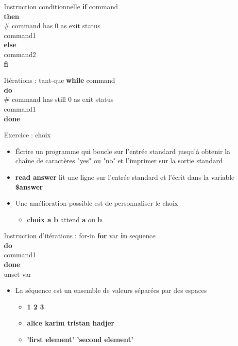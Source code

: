 \documentclass[xcolor=table]{beamer}
\begin{document}
\begin{frame}{Instruction conditionnelle}
\textbf{if} command\\
\textbf{then}\\
\quad \# command has 0 as exit status\\
\quad command1\\
\textbf{else}\\
\quad command2\\
\textbf{fi}\\
\end{frame}

\begin{frame}{Itérations : tant-que}
\textbf{while} command\\
\textbf{do}\\
\quad \# command has still 0 as exit status\\
\quad command1\\
\textbf{done}\\
\end{frame}

\begin{frame}{Exercice : choix}
\begin{itemize}
    \item Écrire un programme qui boucle sur l'entrée standard jusqu'à obtenir la chaîne de caractères "yes" ou "no" et l'imprimer sur la sortie standard
    \item \textbf{read answer} lit une ligne sur l'entrée standard et l'écrit dans la variable \textbf{\$answer}
    \item Une amélioration possible est de personnaliser le choix
    \begin{itemize}
        \item \textbf{choix a b} attend \textbf{a} ou \textbf{b}
    \end{itemize}
\end{itemize}
\end{frame}

\begin{frame}{Instruction d'itérations : for-in}
\textbf{for} var \textbf{in} sequence\\
\textbf{do}\\
\quad command1\\
\textbf{done}\\
unset var\\
\begin{itemize}
    \item La séquence est un ensemble de valeurs séparées par des espaces
    \begin{itemize}
        \item \textbf{1 2 3}
        \item \textbf{alice karim tristan hadjer}
        \item \textbf{'first element' 'second element'}
    \end{itemize}
\end{itemize}
\end{frame}
\end{document}
